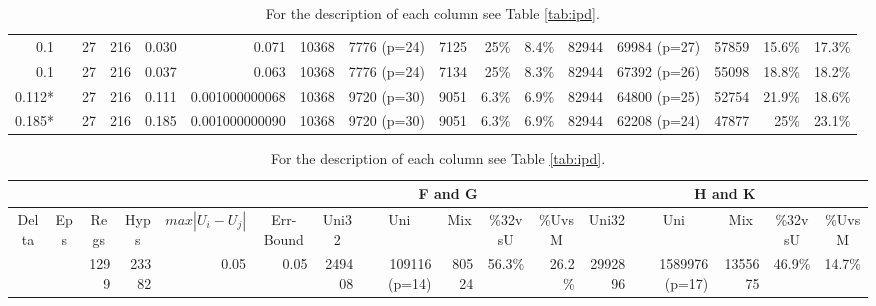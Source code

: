 \begin{landscape}
\begin{table}[p]
\begin{tabular}{rrrrrrrrrrrrrrrr}
		0.1 & \color{red}{0.0008} & 27 & 216 & 0.030 & 0.071 & 10368 & 7776 (p=24) & 7125 & 25\% & 8.4\% & 82944 & 69984 (p=27) & 57859 & 15.6\% & 17.3\% \\
		
		0.1 & \color{red}{0.0010} & 27 & 216 & 0.037 & 0.063 & 10368 & 7776 (p=24) & 7134 & 25\% & 8.3\% & 82944 & 67392 (p=26) & 55098 & 18.8\% & 18.2\% \\
		
		0.112* & \color{red}{0.0030} & 27 & 216 & 0.111 & 0.001000000068 & 10368 &  9720 (p=30) & 9051 & 6.3\% & 6.9\% & 82944 & 64800 (p=25) & 52754 & 21.9\% & 18.6\% \\
		
		0.185* &\color{red}{0.0050} & 27 & 216 & 0.185 & 0.001000000090 & 10368 & 9720 (p=30) & 9051 & 6.3\% & 6.9\% & 82944 & 62208 (p=24) & 47877 & 25\%& 23.1\% \\
		
	\end{tabular}
	\vspace*{1 cm}
	\centering
	\caption{For the description of each column see Table \ref{tab:ipd}.}
	\label{tab:di}
	\begin{tabular}{rrrrrrrrrrrrrrrr}
		\cline{7-11}
		\cline{12-16}
		\multicolumn{4}{c}{} &
		\multicolumn{2}{c}{} &
		\multicolumn{5}{c|}{F and G} &
		\multicolumn{5}{c}{H and K} \\
		\hline
		\multicolumn{1}{c}{Delta}&
		\multicolumn{1}{c}{Eps} &
		\multicolumn{1}{c}{Regs} &
		\multicolumn{1}{c}{Hyps} &
		\multicolumn{1}{c}{$max|U_{i}-U_{j}|$} &
		\multicolumn{1}{c}{Err-Bound} &
		\multicolumn{1}{c}{Uni32}&
		\multicolumn{1}{c}{Uni}&
		\multicolumn{1}{c}{Mix}&
		\multicolumn{1}{c}{\%32vsU}&
		\multicolumn{1}{c}{\%UvsM}&
		\multicolumn{1}{c}{Uni32}&
		\multicolumn{1}{c}{Uni}&
		\multicolumn{1}{c}{Mix}&
		\multicolumn{1}{c}{\%32vsU}&
		\multicolumn{1}{c}{\%UvsM} \\
		\hline
		\color{red}{0.1} & \color{red}{0.001} & 1299 & 23382 & 0.05 & 0.05 & 249408 & 109116 (p=14) & 80524 & 56.3\% & 26.2\% & 2992896 & 1589976 (p=17) & 1355675 & 46.9\% & 14.7\% \\
	\end{tabular}
\end{table}
\end{landscape}
